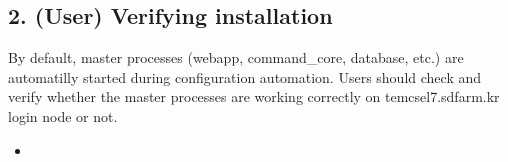 \documentclass[a4paper,10pt,english]{sphinxmanual}
\begin{document}
\subsection{2. (User) Verifying installation}
\label{\detokenize{cryoSPARC:user-verifying-installation}}
\sphinxAtStartPar
By default, master processes (webapp, command\_core, database, etc.) are automatilly started during configuration automation.
Users should check and verify whether the master processes are working correctly on tem\sphinxhyphen{}cs\sphinxhyphen{}el7.sdfarm.kr login node or not.
\begin{itemize}
\item {} 
\sphinxAtStartPar
{}

\end{itemize}
\end{document}
